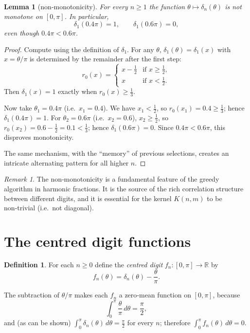 \documentclass[11pt,a4paper]{article}
\newtheorem{lemma}[theorem]{Lemma}
\theoremstyle{definition}
\newtheorem{definition}[theorem]{Definition}
\theoremstyle{remark}
\newtheorem{remark}[theorem]{Remark}
\newcommand{\R}{\mathbb{R}}
\begin{document}
\begin{lemma}[non‑monotonicity]\label{lem:nonmono}
For every \(n\ge 1\) the function \(\theta\mapsto\delta_n(\theta)\) is not monotone on \([0,\pi]\). In particular,
\[
\delta_1(0.4\pi)=1,\qquad \delta_1(0.6\pi)=0,
\]
even though \(0.4\pi < 0.6\pi\).
\end{lemma}
\begin{proof}
Compute using the definition of \(\delta_1\). For any \(\theta\), \(\delta_1(\theta)=\delta_1(x)\) with \(x=\theta/\pi\) is determined by the remainder after the first step:
\[
r_0(x) = 
\begin{cases}
x-\frac12 & \text{if } x\ge\frac12,\\
x & \text{if } x<\frac12.
\end{cases}
\]
Then \(\delta_1(x)=1\) exactly when \(r_0(x)\ge \frac13\).

Now take \(\theta_1 = 0.4\pi\) (i.e.\ \(x_1=0.4\)). We have \(x_1<\frac12\), so \(r_0(x_1)=0.4 \ge \frac13\); hence \(\delta_1(0.4\pi)=1\).
For \(\theta_2 = 0.6\pi\) (i.e.\ \(x_2=0.6\)), \(x_2\ge\frac12\), so \(r_0(x_2)=0.6-\frac12=0.1 < \frac13\); hence \(\delta_1(0.6\pi)=0\).
Since \(0.4\pi < 0.6\pi\), this disproves monotonicity.

The same mechanism, with the ``memory'' of previous selections, creates an intricate alternating pattern for all higher \(n\).
\end{proof}

\begin{remark}
The non‑monotonicity is a fundamental feature of the greedy algorithm in harmonic fractions. It is the source of the rich correlation structure between different digits, and it is essential for the kernel \(K(n,m)\) to be non‑trivial (i.e.\ not diagonal).
\end{remark}

\section{The centred digit functions}

\begin{definition}
For each \(n\ge 0\) define the \emph{centred digit} \(f_n:[0,\pi]\to\R\) by
\begin{equation}\label{eq:f_def}
f_n(\theta) = \delta_n(\theta) - \frac{\theta}{\pi}.
\end{equation}
\end{definition}

The subtraction of \(\theta/\pi\) makes each \(f_n\) a zero‑mean function on \([0,\pi]\), because
\[
\int_0^\pi \frac{\theta}{\pi}\,d\theta = \frac{\pi}{2},
\]
and (as can be shown) \(\int_0^\pi \delta_n(\theta)\,d\theta = \frac{\pi}{2}\) for every \(n\); therefore \(\int_0^\pi f_n(\theta)\,d\theta = 0\).
\end{document}
